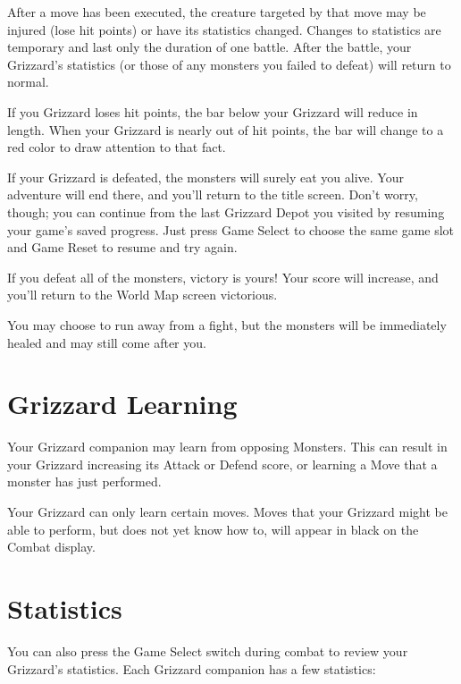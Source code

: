 \documentclass[12pt,openright,book]{memoir}
\begin{document}
After a move  has been executed, the creature targeted  by that move may
be injured (lose hit points) or  have its statistics changed. Changes to
statistics  are temporary  and last  only  the duration  of one  battle.
After the battle,  your Grizzard's statistics (or those  of any monsters
you failed to defeat) will return to normal.

If  you Grizzard  loses hit  points, the  bar below  your Grizzard  will
reduce in  length. When your Grizzard  is nearly out of  hit points, the
bar will change to a red color to draw attention to that fact.

If your  Grizzard is defeated, the  monsters will surely eat  you alive.
Your adventure  will end there, and  you'll return to the  title screen.
Don't worry, though;  you can continue from the last  Grizzard Depot you
visited by resuming  your game's saved progress. Just  press Game Select
to choose the same game slot and Game Reset to resume and try again.

If you  defeat all of  the monsters, victory  is yours! Your  score will
increase, and you'll return to the World Map screen victorious.

You  may choose  to run  away from  a fight,  but the  monsters will  be
immediately healed and may still come after you.

\section{Grizzard Learning}

Your  Grizzard companion  may  learn from  opposing  Monsters. This  can
result  in your  Grizzard  increasing  its Attack  or  Defend score,  or
learning a Move that a monster has just performed.

Your Grizzard  can only  learn certain moves.  Moves that  your Grizzard
might be able to  perform, but does not yet know how  to, will appear in
black on the Combat display.

\section{Statistics}

You can also  press the Game Select switch during  combat to review your
Grizzard's statistics. Each Grizzard companion has a few statistics:
\end{document}
